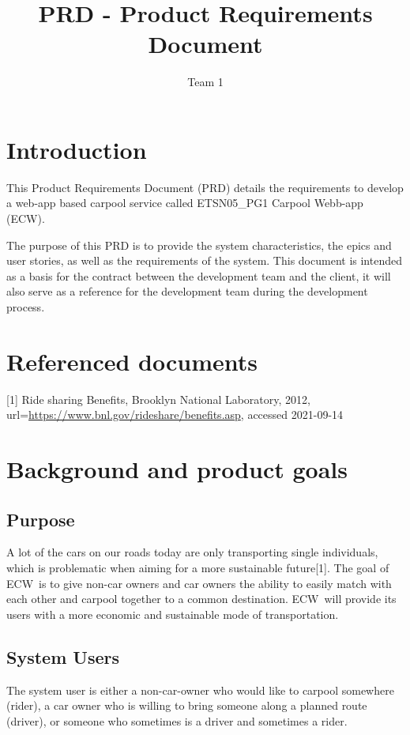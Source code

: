 \documentclass{article}
\title{PRD - Product Requirements Document}
\author{Team 1}
\newcommand{\name}{ECW\ }
\newcommand{\nameNospace}{ECW}
\begin{document}
\date{}
\maketitle
\thispagestyle{fancy}
\newpage

\tableofcontents
\newpage

\section{Introduction}
This Product Requirements Document (PRD) details the requirements to develop a web-app based carpool service called ETSN05\_PG1 Carpool Webb-app (\nameNospace).

The purpose of this PRD is to provide the system characteristics, the epics and user stories, as well as the requirements of the system. This document is intended as a basis for the contract between the development team and the client, it will also serve as a reference for the development team during the development process.

\section{Referenced documents}
[1] Ride sharing Benefits, Brooklyn National Laboratory, 2012, url=\url{https://www.bnl.gov/rideshare/benefits.asp}, accessed 2021-09-14

\section{Background and product goals}
\subsection{Purpose}
A lot of the cars on our roads today are only transporting single individuals, which is problematic when aiming for a more sustainable future[1]. The goal of \name is to give non-car owners and car owners the ability to easily match with each other and carpool together to a common destination. \name will provide its users with a more economic and sustainable mode of transportation.

\subsection{System Users}
The system user is either a non-car-owner who would like to carpool somewhere (rider), a car owner who is willing to bring someone along a planned route (driver), or someone who sometimes is a driver and sometimes a rider.
\end{document}
